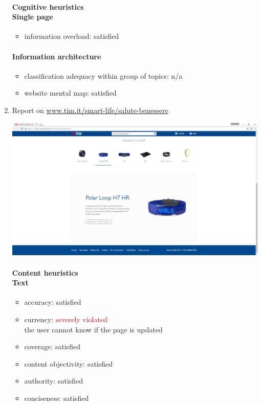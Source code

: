 \begin{enumerate}
	\paragraph*{Cognitive heuristics \\ Single page}
	\begin{itemize}
		\item information overload: satisfied
	\end{itemize}	
	
	\paragraph*{Information architecture}
	\begin{itemize}
		\item classification adequacy within group of topics: n/a
		\item website mental map: satisfied
	\end{itemize}
\newpage


\item Report on \url{www.tim.it/smart-life/salute-benessere}

\begin{center}
	\includegraphics[width=\textwidth]{Screenshot/salute.jpg}
\end{center}
\vspace{1cm}

	\paragraph*{Content heuristics \\ Text}
	\begin{itemize}
		\item accuracy: satisfied
		\item currency: \textcolor{red}{severely violated}\\
		the user cannot know if the page is updated
		\item coverage: satisfied
		\item content objectivity: satisfied
		\item authority: satisfied
		\item conciseness: satisfied		
	\end{itemize}


\end{enumerate}
